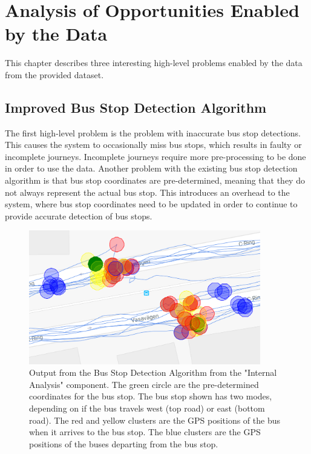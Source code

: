 \chapter{Analysis of Opportunities Enabled by the Data}
\label{cha:high-level-problems}

This chapter describes three interesting high-level problems enabled by the data from the provided dataset.


\section{Improved Bus Stop Detection Algorithm}

The first high-level problem is the problem with inaccurate bus stop detections.
This causes the system to occasionally miss bus stops, which results in faulty or incomplete journeys.
Incomplete journeys require more pre-processing to be done in order to use the data.
Another problem with the existing bus stop detection algorithm is that bus stop coordinates are pre-determined, meaning that they do not always represent the actual bus stop.
This introduces an overhead to the system, where bus stop coordinates need to be updated in order to continue to provide accurate detection of bus stops.

\begin{figure}[ht!]
    \centering
    \includegraphics[width=0.9\textwidth]{figures/bus_stops}
    \caption{Output from the Bus Stop Detection Algorithm from the "Internal Analysis" component.
    The green circle are the pre-determined coordinates for the bus stop.
    The bus stop shown has two modes, depending on if the bus travels west (top road) or east (bottom road).
    The red and yellow clusters are the GPS positions of the bus when it arrives to the bus stop.
    The blue clusters are the GPS positions of the buses departing from the bus stop.
    }
    \label{fig:bus-stop-clusters}
\end{figure}

